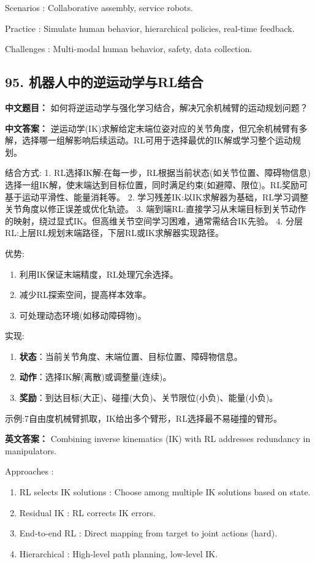 \documentclass[10pt,a4paper]{ctexart}
\begin{document}
 Scenarios : Collaborative assembly, service robots.

 Practice : Simulate human behavior, hierarchical policies, real-time feedback.

 Challenges : Multi-modal human behavior, safety, data collection.

\subsection*{95. 机器人中的逆运动学与RL结合}
\textbf{中文题目：} 如何将逆运动学与强化学习结合，解决冗余机械臂的运动规划问题？

\textbf{中文答案：}  
逆运动学(IK)求解给定末端位姿对应的关节角度，但冗余机械臂有多解，选择哪一组解影响后续运动。RL可用于选择最优的IK解或学习整个运动规划。

 结合方式:
1.  RL选择IK解:在每一步，RL根据当前状态(如关节位置、障碍物信息)选择一组IK解，使末端达到目标位置，同时满足约束(如避障、限位)。RL奖励可基于运动平滑性、能量消耗等。
2.  学习残差IK:以IK求解器为基础，RL学习调整关节角度以修正误差或优化轨迹。
3.  端到端RL:直接学习从末端目标到关节动作的映射，绕过显式IK。但高维关节空间学习困难，通常需结合IK先验。
4.  分层RL:上层RL规划末端路径，下层RL或IK求解器实现路径。

 优势:
\begin{enumerate}
    \item 利用IK保证末端精度，RL处理冗余选择。
    \item 减少RL探索空间，提高样本效率。
    \item 可处理动态环境(如移动障碍物)。
\end{enumerate}

 实现:
\begin{enumerate}
    \item \textbf{状态}：当前关节角度、末端位置、目标位置、障碍物信息。
    \item \textbf{动作}：选择IK解(离散)或调整量(连续)。
    \item \textbf{奖励}：到达目标(大正)、碰撞(大负)、关节限位(小负)、能量(小负)。
\end{enumerate}

 示例:7自由度机械臂抓取，IK给出多个臂形，RL选择最不易碰撞的臂形。

\textbf{英文答案：}  
Combining inverse kinematics (IK) with RL addresses redundancy in manipulators.

 Approaches :
\begin{enumerate}
    \item RL selects IK solutions : Choose among multiple IK solutions based on state.
    \item Residual IK : RL corrects IK errors.
    \item End-to-end RL : Direct mapping from target to joint actions (hard).
    \item Hierarchical : High-level path planning, low-level IK.
\end{enumerate}
\end{document}
